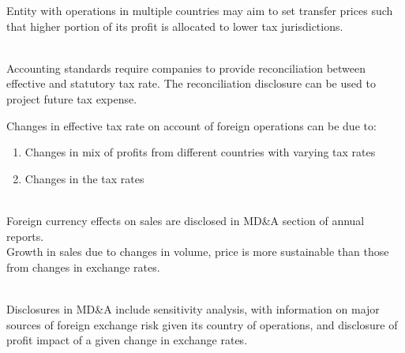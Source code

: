 Entity with operations in multiple countries may aim to set transfer prices such that higher portion of its profit is allocated to lower tax jurisdictions.

\begin{remark} \\
Accounting standards require companies to provide reconciliation between effective and statutory tax rate. The reconciliation disclosure can be used to project future tax expense.
\end{remark}

\begin{remark} Changes in effective tax rate on account of foreign operations can be due to:
\begin{enumerate}[label=\roman*.]
\setlength{\itemsep}{0pt}
\item Changes in mix of profits from different countries with varying tax rates
\item Changes in the tax rates
\end{enumerate}
\end{remark}

\begin{remark} \\
Foreign currency effects on sales are disclosed in MD\&A section of annual reports.\\
Growth in sales due to changes in volume, price is more sustainable than those from changes in exchange rates.
\end{remark}

\begin{remark} \\
Disclosures in MD\&A include sensitivity analysis, with information on major sources of foreign exchange risk given its country of operations, and disclosure of profit impact of a given change in exchange rates.
\end{remark}